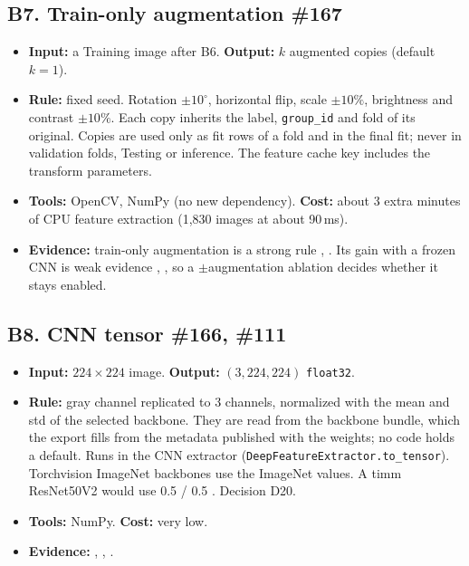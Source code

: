 \documentclass[11pt,a4paper]{article}
\newcommand{\board}[1]{\textsf{\##1}}
\begin{document}
\subsection*{B7. Train-only augmentation \hfill \board{167}}
\begin{itemize}
  \item \textbf{Input:} a Training image after B6. \textbf{Output:} $k$ augmented copies (default $k=1$).
  \item \textbf{Rule:} fixed seed. Rotation $\pm10^\circ$, horizontal flip, scale $\pm10\%$, brightness and contrast $\pm10\%$. Each copy inherits the label, \texttt{group\_id} and fold of its original. Copies are used only as fit rows of a fold and in the final fit; never in validation folds, Testing or inference. The feature cache key includes the transform parameters.
  \item \textbf{Tools:} OpenCV, NumPy (no new dependency). \textbf{Cost:} about 3 extra minutes of CPU feature extraction (1,830 images at about 90\,ms).
  \item \textbf{Evidence:} train-only augmentation is a strong rule \cite{r4}, \cite{r2}. Its gain with a frozen CNN is weak evidence \cite{r9}, \cite{r5}, so a $\pm$augmentation ablation decides whether it stays enabled.
\end{itemize}

\subsection*{B8. CNN tensor \hfill \board{166}, \board{111}}
\begin{itemize}
  \item \textbf{Input:} $224\times224$ image. \textbf{Output:} $(3, 224, 224)$ \texttt{float32}.
  \item \textbf{Rule:} gray channel replicated to 3 channels, normalized with the mean and std of the selected backbone. They are read from the backbone bundle, which the export fills from the metadata published with the weights; no code holds a default. Runs in the CNN extractor (\texttt{DeepFeatureExtractor.to\_tensor}). Torchvision ImageNet backbones use the ImageNet values. A timm ResNet50V2 would use 0.5 / 0.5 \cite{r11}. Decision D20.
  \item \textbf{Tools:} NumPy. \textbf{Cost:} very low.
  \item \textbf{Evidence:} \cite{r5}, \cite{r10}, \cite{r11}.
\end{itemize}
\end{document}
